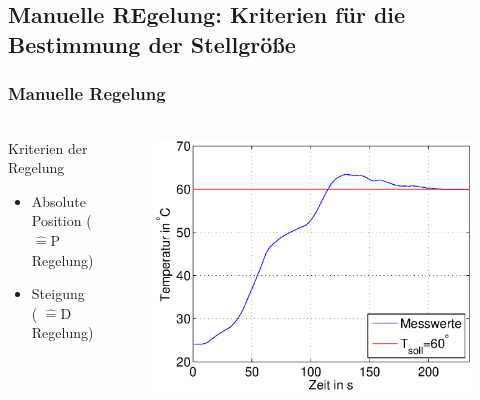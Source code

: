 \subsection{Manuelle REgelung: Kriterien für die Bestimmung der Stellgröße} %
\label{sub:Manuelle_REgelung:_Kriterien_für_die_Bestimmung_der_Stellgröße}
\begin{frame}
    \frametitle{Manuelle Regelung}
    \framesubtitle{}
    \begin{columns}[c]
            \begin{block}{Kriterien der Regelung}
                \begin{itemize}
                    \item Absolute Position ( $\hat{=}$P Regelung)
                    \item Steigung ( $\hat{=}$D Regelung) 
                \end{itemize}
            \end{block}    
             \begin{figure}[H]
             \begin{center}
                     \includegraphics[scale=0.3]{./img/plots/2a.eps}
             \end{center}
             \end{figure}
    \end{columns}
\end{frame}
